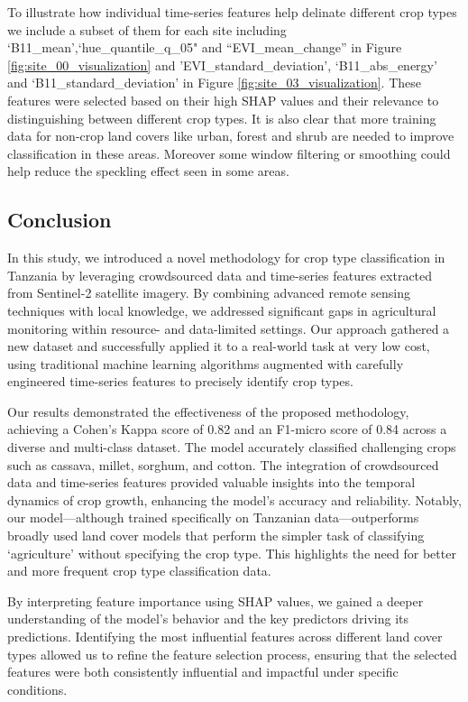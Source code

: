 \documentclass[
  journal,
  twocolumn]{IEEEtran}
\begin{document}
To illustrate how individual time-series features help delinate
different crop types we include a subset of them for each site including
`B11\_mean',`hue\_quantile\_q\_05" and ``EVI\_mean\_change'' in Figure
\ref{fig:site_00_visualization} and 'EVI\_standard\_deviation',
`B11\_abs\_energy' and `B11\_standard\_deviation' in Figure
\ref{fig:site_03_visualization}. These features were selected based on
their high SHAP values and their relevance to distinguishing between
different crop types. It is also clear that more training data for
non-crop land covers like urban, forest and shrub are needed to improve
classification in these areas. Moreover some window filtering or
smoothing could help reduce the speckling effect seen in some areas.

\hypertarget{conclusion}{%
\subsection{Conclusion}\label{conclusion}}

In this study, we introduced a novel methodology for crop type
classification in Tanzania by leveraging crowdsourced data and
time-series features extracted from Sentinel-2 satellite imagery. By
combining advanced remote sensing techniques with local knowledge, we
addressed significant gaps in agricultural monitoring within resource-
and data-limited settings. Our approach gathered a new dataset and
successfully applied it to a real-world task at very low cost, using
traditional machine learning algorithms augmented with carefully
engineered time-series features to precisely identify crop types.

Our results demonstrated the effectiveness of the proposed methodology,
achieving a Cohen's Kappa score of 0.82 and an F1-micro score of 0.84
across a diverse and multi-class dataset. The model accurately
classified challenging crops such as cassava, millet, sorghum, and
cotton. The integration of crowdsourced data and time-series features
provided valuable insights into the temporal dynamics of crop growth,
enhancing the model's accuracy and reliability. Notably, our
model---although trained specifically on Tanzanian data---outperforms
broadly used land cover models that perform the simpler task of
classifying `agriculture' without specifying the crop type. This
highlights the need for better and more frequent crop type
classification data.

By interpreting feature importance using SHAP values, we gained a deeper
understanding of the model's behavior and the key predictors driving its
predictions. Identifying the most influential features across different
land cover types allowed us to refine the feature selection process,
ensuring that the selected features were both consistently influential
and impactful under specific conditions.
\end{document}
